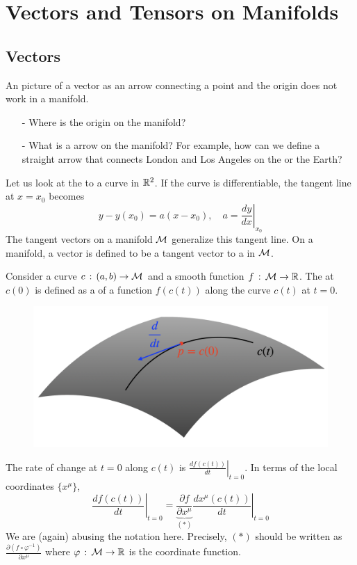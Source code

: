 \documentclass[a4paper, 10pt]{article}
\begin{document}
\setcounter{section}{4}
\section{Vectors and Tensors on Manifolds}

\subsection{Vectors}

An  picture of a vector as an arrow connecting a point and the origin does not work in a manifold.
\begin{itemize}
    \item[-] Where is the origin on the manifold?
    \item[-] What is a  arrow on the manifold? For example, how can we define a straight arrow that connects London and Los Angeles on the  or the Earth?
\end{itemize}

Let us look at the  to a curve in $\mathbb{R}^{2}$. If the curve is differentiable, the tangent line at $x = x_{0}$ becomes
\[ y - y(x_{0}) = a(x - x_{0}),\quad a = \left.\frac{dy}{dx}\right|_{x_{0}} \]
The tangent vectors on a manifold $\mathcal{M}$ generalize this tangent line. On a manifold, a vector is defined to be a tangent vector to a  in $\mathcal{M}$.

\seprule

\begin{definition}
    Consider a curve $c \,:\, (a,b) \rightarrow \mathcal{M}$ and a smooth function $f \,:\, \mathcal{M} \rightarrow \mathbb{R}$. The  at $c(0)$ is defined as a  of a function $f(c(t))$ along the curve $c(t)$ at $t = 0$.

    \begin{figure}[htbp]
        \centering
        \includegraphics[width=0.5\linewidth]{../images/lecture06/6_01.png}
    \end{figure}

    The rate of change at $t=0$ along $c(t)$ is $\displaystyle{\left.\frac{df(c(t))}{dt}\right|_{t = 0}}$. In terms of the local coordinates $\{x^{\mu}\}$,
    \[ \left.\frac{df(c(t))}{dt}\right|_{t = 0} = \underbrace{\frac{\partial f}{\partial x^{\mu}}}_{(\ast)}\left.\frac{dx^{\mu}(c(t))}{dt}\right|_{t = 0} \]
    We are (again) abusing the notation here. Precisely, $(\ast)$ should be written as $\displaystyle{\frac{\partial(f\circ\varphi^{-1})}{\partial{x}^{\mu}}}$ where $\varphi \,:\, \mathcal{M} \rightarrow \mathbb{R}$ is the coordinate function.
\end{definition}
\newpage
\end{document}

